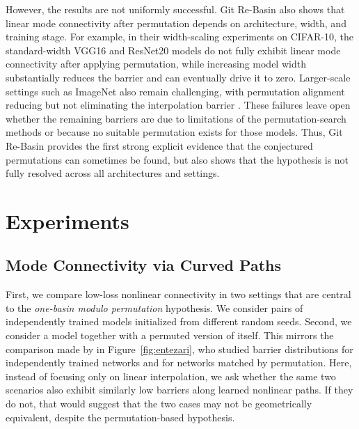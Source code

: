 \documentclass[11pt,a4paper]{report}
\begin{document}
However, the results are not uniformly successful. Git Re-Basin also shows that
linear mode connectivity after permutation depends on architecture, width, and
training stage. For example, in their width-scaling experiments on CIFAR-10, the
standard-width VGG16 and ResNet20 models do not fully exhibit linear mode
connectivity after applying permutation, while increasing model width substantially reduces
the barrier and can eventually drive it to zero. Larger-scale settings such as
ImageNet also remain challenging, with permutation alignment reducing but not
eliminating the interpolation barrier \citep{ainsworth2023git}. These failures
leave open whether the remaining barriers are due to limitations of the
permutation-search methods or because no suitable permutation exists for those
models. Thus, Git Re-Basin provides the first strong explicit evidence that the
conjectured permutations can sometimes be found, but also shows that the
hypothesis is not fully resolved across all architectures and settings.


\chapter{Experiments}


\section{Mode Connectivity via Curved Paths}

First, we compare low-loss nonlinear connectivity in two settings that are central to the \textit{one-basin modulo permutation} hypothesis. We consider pairs of independently trained models initialized from different random seeds. Second, we consider a model together with a permuted version of itself. This mirrors the comparison made by \citep{entezari2021role} in Figure~\ref{fig:entezari}, who studied barrier distributions for independently trained networks and for networks matched by permutation. Here, instead of focusing only on linear interpolation, we ask whether the same two scenarios also exhibit similarly low barriers along learned nonlinear paths. If they do not, that would suggest that the two cases may not be geometrically equivalent, despite the permutation-based hypothesis.
\end{document}
